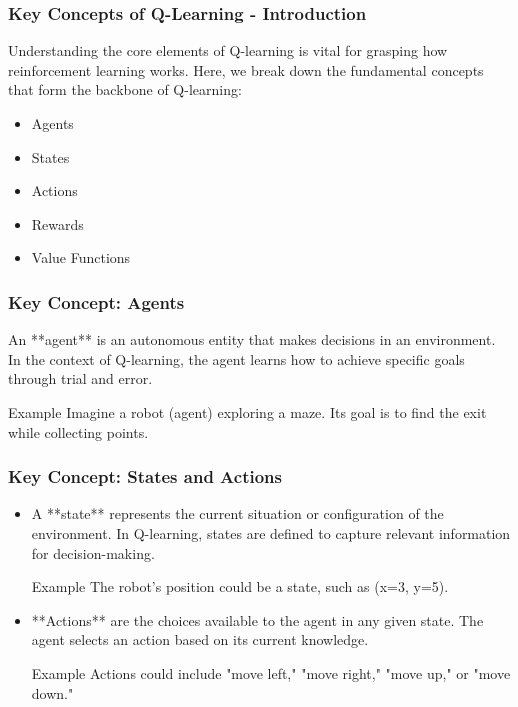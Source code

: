 \documentclass{beamer}
\begin{document}
\begin{frame}[fragile]
    \frametitle{Key Concepts of Q-Learning - Introduction}
    Understanding the core elements of Q-learning is vital for grasping how reinforcement learning works. 
    Here, we break down the fundamental concepts that form the backbone of Q-learning:
    
    \begin{itemize}
        \item Agents
        \item States
        \item Actions
        \item Rewards
        \item Value Functions
    \end{itemize}
\end{frame}

\begin{frame}[fragile]
    \frametitle{Key Concept: Agents}
    An **agent** is an autonomous entity that makes decisions in an environment. 
    In the context of Q-learning, the agent learns how to achieve specific goals through trial and error.
    
    \begin{block}{Example}
        Imagine a robot (agent) exploring a maze. Its goal is to find the exit while collecting points.
    \end{block}
\end{frame}

\begin{frame}[fragile]
    \frametitle{Key Concept: States and Actions}
    \begin{itemize}
        \item A **state** represents the current situation or configuration of the environment. 
        In Q-learning, states are defined to capture relevant information for decision-making.
        
        \begin{block}{Example}
            The robot's position could be a state, such as (x=3, y=5).
        \end{block}
        
        \item **Actions** are the choices available to the agent in any given state. 
        The agent selects an action based on its current knowledge.
        
        \begin{block}{Example}
            Actions could include "move left," "move right," "move up," or "move down."
        \end{block}
    \end{itemize}
\end{frame}
\end{document}
